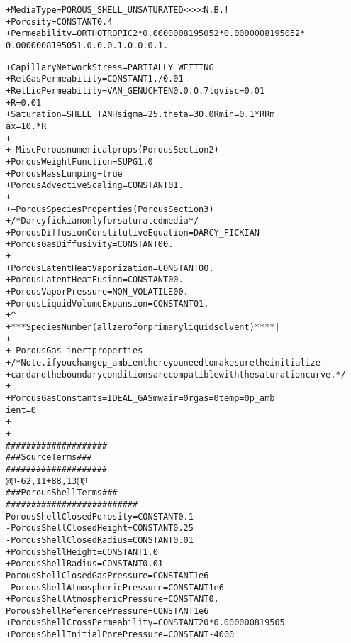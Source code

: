 \documentclass{article}
\begin{document}
\begin{alltt}
+Media Type                        = POROUS_SHELL_UNSATURATED  <<<<N. B.!
+Porosity                = CONSTANT    {0.4}
+Permeability            = ORTHOTROPIC {2*0.000000819505} {2*0.000000819505} {2*
0.000000819505} 1. 0. 0. 0. 1. 0. 0. 0. 1. 
 
+Capillary Network Stress = PARTIALLY_WETTING
+Rel Gas Permeability     = CONSTANT  {1./0.01} 
+Rel Liq Permeability     = VAN_GENUCHTEN  0. 0. 0.7 {lqvisc=0.01}
+{R=0.01} 
+Saturation             = SHELL_TANH {sigma=25.} {theta=30.0} {Rmin = 0.1*R} {Rm
ax = 10.*R}
+
+--Misc Porous numerical props (Porous Section 2)
+Porous Weight Function          = SUPG 1.0
+Porous Mass Lumping             = true
+Porous Advective Scaling         = CONSTANT 0 1.
+
+---Porous Species Properties (Porous Section 3)
+/* Darcy fickian only for saturated media */
+Porous Diffusion Constitutive Equation = DARCY_FICKIAN
+Porous Gas Diffusivity              = CONSTANT  0  0.
+
+Porous Latent Heat Vaporization = CONSTANT  0   0.
+Porous Latent Heat Fusion       = CONSTANT  0   0.
+Porous Vapor Pressure           = NON_VOLATILE  0   0.
+Porous Liquid Volume Expansion  = CONSTANT  0   1.
+                                            ^
+***Species Number (all zero for primary liquid solvent)****|
+
+--Porous Gas-inert properties
+/*Note. if you change p_ambient here you need to make sure the initialize
+card and the boundary conditions are compatible with the saturation curve. */
+
+Porous Gas Constants           = IDEAL_GAS   {mwair=0} {rgas=0} {temp=0} {p_amb
ient=0}
+
+
 ####################
 ### Source Terms ###
 ####################
@@ -62,11 +88,13 @@
 ### Porous Shell Terms ###
 ##########################
 Porous Shell Closed Porosity     = CONSTANT 0.1
-Porous Shell Closed Height       = CONSTANT 0.25
-Porous Shell Closed Radius       = CONSTANT 0.01
+Porous Shell Height              = CONSTANT 1.0
+Porous Shell Radius              = CONSTANT 0.01
 Porous Shell Closed Gas Pressure = CONSTANT 1e6
-Porous Shell Atmospheric Pressure = CONSTANT 1e6
+Porous Shell Atmospheric Pressure = CONSTANT 0.
 Porous Shell Reference Pressure   = CONSTANT 1e6
+Porous Shell Cross Permeability = CONSTANT {20*0.000000819505}
+Porous Shell Initial Pore Pressure = CONSTANT -4000

\end{alltt}
\end{document}
